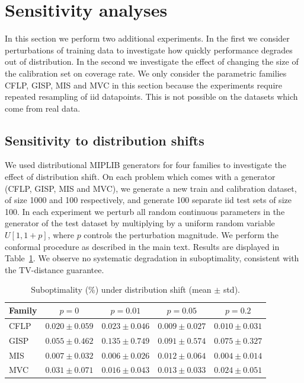 \documentclass[12pt]{article}
\theoremstyle{definition}
\theoremstyle{remark}
\newcommand{\change}[1]{#1}
\newcommand{\change}[1]{#1}
\theoremstyle{plain}
\theoremstyle{definition}
\theoremstyle{remark}
\begin{document}
\change{
\section{Sensitivity analyses}
In this section we perform two additional experiments.
In the first we consider perturbations of training data to investigate how quickly performance degrades out of distribution.
In the second we investigate the effect of changing the size of the calibration set on coverage rate.
We only consider the parametric families CFLP, GISP, MIS and MVC in this section because the experiments require repeated resampling of iid datapoints.
This is not possible on the datasets which come from real data.
\subsection{Sensitivity to distribution shifts}
We used distributional MIPLIB generators for four families to investigate the effect of distribution shift.
On each problem which comes with a generator (CFLP, GISP, MIS and MVC), we generate a new train and calibration dataset, of size 1000 and 100 respectively, and generate 100 separate iid test sets of size 100.
In each experiment we perturb all random continuous parameters in the generator of the test dataset by multiplying by a uniform random variable $U[1, 1+p]$, where $p$ controls the perturbation magnitude.
We perform the conformal procedure as described in the main text.
Results are displayed in Table~\ref{tab:perturbation_subopt}.
We observe no systematic degradation in suboptimality, consistent with the TV-distance guarantee.

\begin{table}[h]
\small
\centering
\caption{Suboptimality (\%) under distribution shift (mean $\pm$ std).}
\label{tab:perturbation_subopt}
\begin{tabular}{lcccc}
\toprule
Family & $p=0$ & $p=0.01$ & $p=0.05$ & $p=0.2$ \\
\midrule
CFLP & $0.020 \pm 0.059$ & $0.023 \pm 0.046$ & $0.009 \pm 0.027$ & $0.010 \pm 0.031$ \\
GISP & $0.055 \pm 0.462$ & $0.135 \pm 0.749$ & $0.091 \pm 0.574$ & $0.075 \pm 0.327$ \\
MIS  & $0.007 \pm 0.032$ & $0.006 \pm 0.026$ & $0.012 \pm 0.064$ & $0.004 \pm 0.014$ \\
MVC  & $0.031 \pm 0.071$ & $0.016 \pm 0.043$ & $0.013 \pm 0.033$ & $0.024 \pm 0.051$ \\
\bottomrule
\end{tabular}
\end{table}

}
\end{document}

